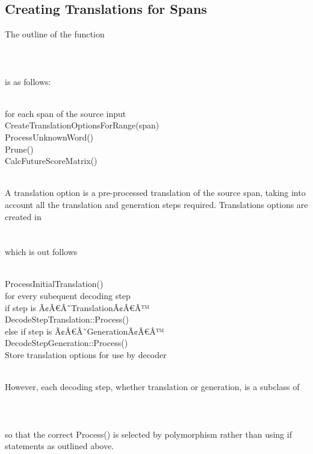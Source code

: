 \documentclass[10pt]{report}
\theoremstyle{plain}
\begin{document}
{\subsection{Creating Translations for Spans}
The outline of the function \\
\\
\\
\\
is as follows:\\
\\
\begin{tt}
\indent	for each span of the source input\\
\indent \indent	CreateTranslationOptionsForRange(span)\\
\indent	ProcessUnknownWord()\\
\indent	Prune()\\
\indent	CalcFutureScoreMatrix()\\
\end{tt}
\\
A translation option is a pre-processed translation of the source span, taking into account all the translation and generation steps required. Translations options are created in\\
\\
\\
which is out follows\\
\\
\begin{tt}
\indent	ProcessInitialTranslation()\\
\indent	for every subequent decoding step\\
\indent \indent	if step is Ã¢Â€Â˜TranslationÃ¢Â€Â™\\
\indent \indent \indent	DecodeStepTranslation::Process()\\
\indent \indent else if step is Ã¢Â€Â˜GenerationÃ¢Â€Â™\\
\indent \indent \indent DecodeStepGeneration::Process()\\
\indent Store translation options for use by decoder\\
\end{tt}
\\
However, each decoding step, whether translation or generation, is a subclass of\\
\\
\\
\\
so that the correct Process() is selected by polymorphism rather than using if statements as outlined above.
}
\end{document}
